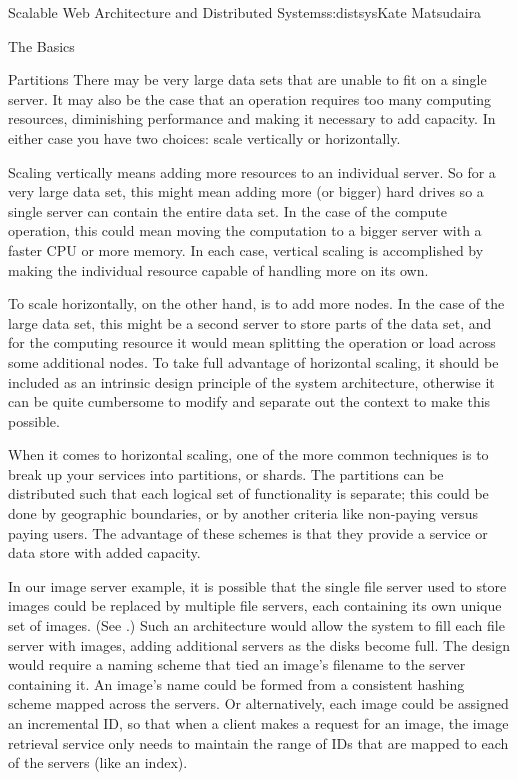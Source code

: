\begin{aosachapter}{Scalable Web Architecture and Distributed Systems}{s:distsys}{Kate Matsudaira}
\begin{aosasect1}{The Basics}
\begin{aosasect2}{Partitions}
There may be very large data sets that are unable to fit on a single
server. It may also be the case that an operation requires too many
computing resources, diminishing performance and making it
necessary to add capacity. In either case you have two choices: scale
vertically or horizontally.

Scaling vertically means adding more resources to an individual
server. So for a very large data set, this might mean adding more (or
bigger) hard drives so a single server can contain the entire data set. In
the case of the compute operation, this could mean moving the
computation to a bigger server with a faster CPU or more memory. In
each case, vertical scaling is accomplished by making the individual
resource capable of handling more on its own.

To scale horizontally, on the other hand, is to add more nodes. In the
case of the large data set, this might be a second server to store 
parts of the data set, and for the computing resource it
would mean splitting the operation or load across some additional
nodes. To take full advantage of horizontal scaling, it should be
included as an intrinsic design principle of the system
architecture, otherwise it can be quite cumbersome to modify and
separate out the context to make this possible.

When it comes to horizontal scaling, one of the more common
techniques is to break up your services into partitions, or shards. 
The partitions can be distributed such
that each logical set of functionality is separate; this could be
done by geographic boundaries, or by another criteria like non-paying versus
paying users. The advantage of these schemes is that they provide a service
or data store with added capacity.

In our image server example, it is possible that the single file
server used to store images could be replaced by multiple file
servers, each containing its own unique set of images. 
(See .) Such an
architecture would allow the system to fill each file server with
images, adding additional servers as the disks become full. The
design would require a naming scheme that tied an image's filename
to the server containing it. An image's name could be formed from a
consistent hashing scheme mapped across the servers. Or alternatively,
each image could be assigned an incremental ID, so that when a client
makes a request for an image, the image retrieval service only needs
to maintain the range of IDs that are mapped to each of the servers
(like an index).


\end{aosasect2}
\end{aosasect1}
\end{aosachapter}
